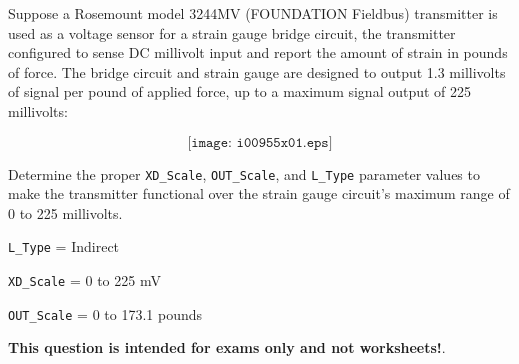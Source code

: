 

Suppose a Rosemount model 3244MV (FOUNDATION Fieldbus) transmitter is used as a voltage sensor for a strain gauge bridge circuit, the transmitter configured to sense DC millivolt input and report the amount of strain in pounds of force.  The bridge circuit and strain gauge are designed to output 1.3 millivolts of signal per pound of applied force, up to a maximum signal output of 225 millivolts:

$$\texttt{[image: i00955x01.eps]}$$

Determine the proper {\tt XD\_Scale}, {\tt OUT\_Scale}, and {\tt L\_Type} parameter values to make the transmitter functional over the strain gauge circuit's maximum range of 0 to 225 millivolts.







{\tt L\_Type} = Indirect

\vskip 10pt

{\tt XD\_Scale} = 0 to 225 mV

\vskip 10pt

{\tt OUT\_Scale} = 0 to 173.1 pounds







{\bf This question is intended for exams only and not worksheets!}.



